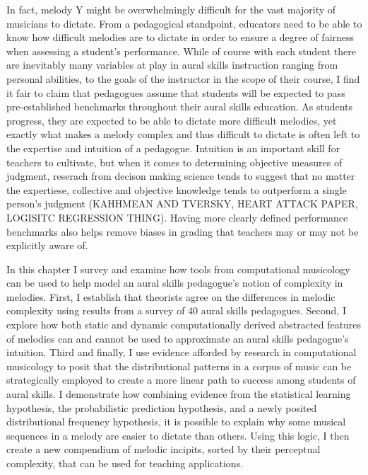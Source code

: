 \documentclass[]{book}
\begin{document}
In fact, melody Y might be overwhelmingly difficult for the vast majority of musicians to dictate.
From a pedagogical standpoint, educators need to be able to know how difficult melodies are to dictate in order to ensure a degree of fairness when assessing a student's performance.
While of course with each student there are inevitably many variables at play in aural skills instruction ranging from personal abilities, to the goals of the instructor in the scope of their course, I find it fair to claim that pedagogues assume that students will be expected to pass pre-established benchmarks throughout their aural skills education.
As students progress, they are expected to be able to dictate more difficult melodies, yet exactly what makes a melody complex and thus difficult to dictate is often left to the expertise and intuition of a pedagogue.
Intuition is an important skill for teachers to cultivate, but when it comes to determining objective measures of judgment, reserach from decison making science tends to suggest that no matter the expertiese, collective and objective knowledge tends to outperform a single person's judgment (KAHHMEAN AND TVERSKY, HEART ATTACK PAPER, LOGISITC REGRESSION THING).
Having more clearly defined performance benchmarks also helps remove biases in grading that teachers may or may not be explicitly aware of.

In this chapter I survey and examine how tools from computational musicology can be used to help model an aural skills pedagogue's notion of complexity in melodies.
First, I establish that theorists agree on the differences in melodic complexity using results from a survey of 40 aural skills pedagogues.
Second, I explore how both static and dynamic computationally derived abstracted features of melodies can and cannot be used to approximate an aural skills pedagogue's intuition.
Third and finally, I use evidence afforded by research in computational musicology to posit that the distributional patterns in a corpus of music can be strategically employed to create a more linear path to success among students of aural skills.
I demonstrate how combining evidence from the statistical learning hypothesis, the probabilistic prediction hypothesis, and a newly posited distributional frequency hypothesis, it is possible to explain why some musical sequences in a melody are easier to dictate than others.
Using this logic, I then create a new compendium of melodic incipits, sorted by their perceptual complexity, that can be used for teaching applications.
\end{document}
